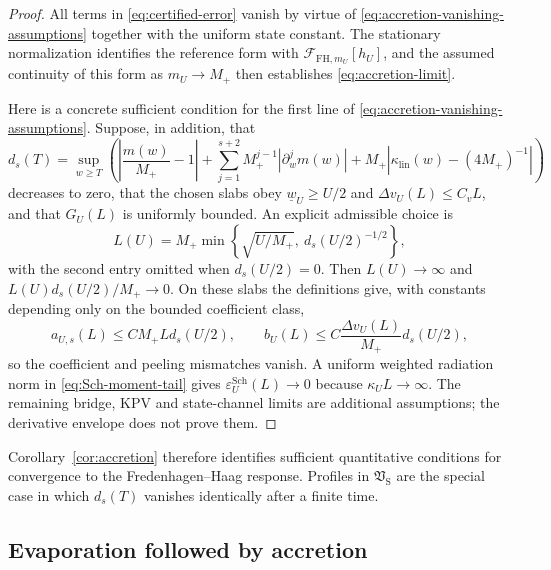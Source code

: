 \documentclass[11pt,a4paper]{article}
\theoremstyle{definition}
\theoremstyle{remark}
\begin{document}
	\begin{proof}
		All terms in \eqref{eq:certified-error} vanish by virtue of \eqref{eq:accretion-vanishing-assumptions} together with the uniform state constant. The stationary normalization identifies the reference form with \(\mathcal{F}_{\mathrm{FH},m_U}[h_U]\), and the assumed continuity of this form as \(m_U\to M_+\) then establishes \eqref{eq:accretion-limit}.
		
		Here is a concrete sufficient condition for the first line of
		\eqref{eq:accretion-vanishing-assumptions}.  Suppose, in addition, that
		\begin{equation}
			d_s(T)=\sup_{w\geq T}\left(
			\left|\frac{m(w)}{M_+}-1\right|
			+\sum_{j=1}^{s+2}M_+^{j-1}|\partial_w^jm(w)|
			+M_+\left|\kappa_{\mathrm{lin}}(w)-(4M_+)^{-1}\right|\right)
		\end{equation}
		decreases to zero, that the chosen slabs obey
		$\underline w_U\geq U/2$ and $\Delta v_U(L)\leq C_vL$, and that
		$G_U(L)$ is uniformly bounded.  An explicit admissible choice is
		\begin{equation}
			L(U)=M_+\min\left\{\sqrt{U/M_+},\ d_s(U/2)^{-1/2}\right\},
			\label{eq:accretion-window-choice}
		\end{equation}
		with the second entry omitted when $d_s(U/2)=0$.  Then $L(U)\to\infty$ and
		$L(U)d_s(U/2)/M_+\to0$.  On these slabs the definitions give, with constants
		depending only on the bounded coefficient class,
		\begin{equation}
			a_{U,s}(L)\leq C M_+L d_s(U/2),\qquad
			b_U(L)\leq C\frac{\Delta v_U(L)}{M_+}d_s(U/2),
		\end{equation}
		so the coefficient and peeling mismatches vanish.  A uniform weighted
		radiation norm in \eqref{eq:Sch-moment-tail} gives
		$\varepsilon_U^{\mathrm{Sch}}(L)\to0$ because
		$\kappa_UL\to\infty$.  The remaining bridge, KPV and state-channel limits
		are additional assumptions; the derivative envelope does not
		prove them.
	\end{proof}
	
	Corollary~\ref{cor:accretion} therefore identifies sufficient quantitative
	conditions for convergence to the Fredenhagen--Haag response.  Profiles in
	$\mathfrak V_{\mathrm S}$ are the special case in which $d_s(T)$ vanishes
	identically after a finite time.
	
	\subsection{Evaporation followed by accretion}
	
\end{document}
